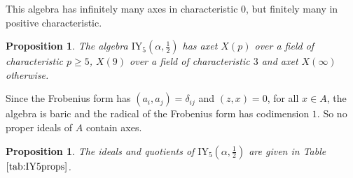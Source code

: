 \documentclass[11pt, a4paper]{article}
\theoremstyle{plain}
\newtheorem{proposition}[theorem]{Proposition}
\theoremstyle{definition}
\newcommand\al{\alpha}
\newcommand{\IY}{\mathrm{IY}}
\newcommand{\0}{\overline{0}}
\newcommand{\2}{\overline{2}}
\newcommand{\1}{\mathbbm{1}}
\begin{document}
This algebra has infinitely many axes in characteristic $0$, but finitely many in positive characteristic.

\begin{proposition}\textup{\cite[Corollary 7.12]{forbidden}}\label{IY5axet}
The algebra $\IY_5(\al, \frac{1}{2})$ has axet $X(p)$ over a field of characteristic $p \geq 5$, $X(9)$ over a field of characteristic $3$ and axet $X(\infty)$ otherwise.
\end{proposition}

Since the Frobenius form has $(a_i,a_j) = \delta_{ij}$ and $(z,x) = 0$, for all $x \in A$, the algebra is baric and the radical of the Frobenius form has codimension $1$.  So no proper ideals of $A$ contain axes.

\begin{proposition}
The ideals and quotients of $\IY_5(\al,\frac{1}{2})$ are given in Table $\ref{tab:IY5props}$.
\end{proposition}
\end{document}
